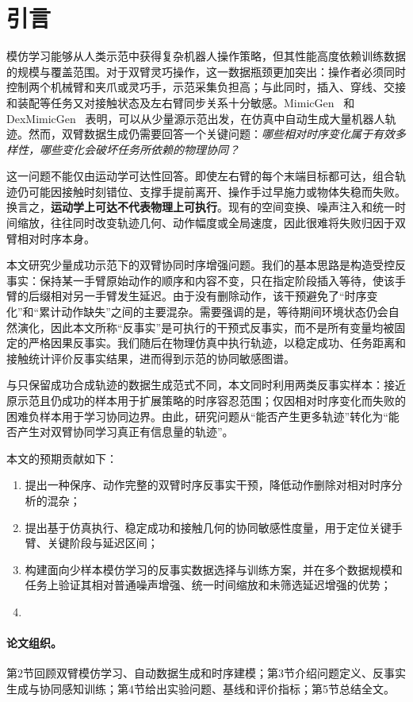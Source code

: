 \section{引言}

模仿学习能够从人类示范中获得复杂机器人操作策略，但其性能高度依赖训练数据的规模与覆盖范围。对于双臂灵巧操作，这一数据瓶颈更加突出：操作者必须同时控制两个机械臂和夹爪或灵巧手，示范采集负担高；与此同时，插入、穿线、交接和装配等任务又对接触状态及左右臂同步关系十分敏感。MimicGen~\cite{mandlekar2023mimicgen} 和 DexMimicGen~\cite{jiang2024dexmimicgen} 表明，可以从少量源示范出发，在仿真中自动生成大量机器人轨迹。然而，双臂数据生成仍需要回答一个关键问题：\emph{哪些相对时序变化属于有效多样性，哪些变化会破坏任务所依赖的物理协同？}

这一问题不能仅由运动学可达性回答。即使左右臂的每个末端目标都可达，组合轨迹仍可能因接触时刻错位、支撑手提前离开、操作手过早施力或物体失稳而失败。换言之，\textbf{运动学上可达不代表物理上可执行}。现有的空间变换、噪声注入和统一时间缩放，往往同时改变轨迹几何、动作幅度或全局速度，因此很难将失败归因于双臂相对时序本身。

本文研究少量成功示范下的双臂协同时序增强问题。我们的基本思路是构造受控反事实：保持某一手臂原始动作的顺序和内容不变，只在指定阶段插入等待，使该手臂的后缀相对另一手臂发生延迟。由于没有删除动作，该干预避免了“时序变化”和“累计动作缺失”之间的主要混杂。需要强调的是，等待期间环境状态仍会自然演化，因此本文所称“反事实”是可执行的干预式反事实，而不是所有变量均被固定的严格因果反事实。我们随后在物理仿真中执行轨迹，以稳定成功、任务距离和接触统计评价反事实结果，进而得到示范的协同敏感图谱。

与只保留成功合成轨迹的数据生成范式不同，本文同时利用两类反事实样本：接近原示范且仍成功的样本用于扩展策略的时序容忍范围；仅因相对时序变化而失败的困难负样本用于学习协同边界。由此，研究问题从“能否产生更多轨迹”转化为“能否产生对双臂协同学习真正有信息量的轨迹”。

本文的预期贡献如下：
\begin{enumerate}
    \item 提出一种保序、动作完整的双臂时序反事实干预，降低动作删除对相对时序分析的混杂；
    \item 提出基于仿真执行、稳定成功和接触几何的协同敏感性度量，用于定位关键手臂、关键阶段与延迟区间；
    \item 构建面向少样本模仿学习的反事实数据选择与训练方案，并在多个数据规模和任务上验证其相对普通噪声增强、统一时间缩放和未筛选延迟增强的优势；
    \item {}
\end{enumerate}

\paragraph{论文组织。}
第2节回顾双臂模仿学习、自动数据生成和时序建模；第3节介绍问题定义、反事实生成与协同感知训练；第4节给出实验问题、基线和评价指标；第5节总结全文。
